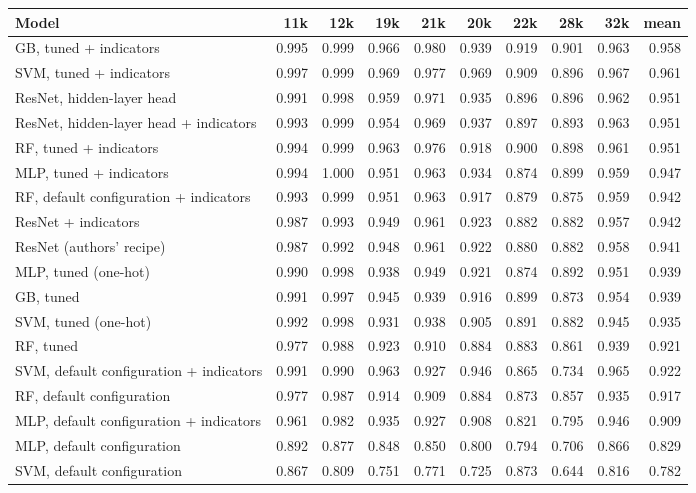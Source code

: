 \begin{tabular}{lrrrrrrrrr}
\toprule
Model & 11k & 12k & 19k & 21k & 20k & 22k & 28k & 32k & mean \\
\midrule
GB, tuned + indicators & 0.995 & 0.999 & 0.966 & 0.980 & 0.939 & 0.919 & 0.901 & 0.963 & 0.958 \\
SVM, tuned + indicators & 0.997 & 0.999 & 0.969 & 0.977 & 0.969 & 0.909 & 0.896 & 0.967 & 0.961 \\
ResNet, hidden-layer head & 0.991 & 0.998 & 0.959 & 0.971 & 0.935 & 0.896 & 0.896 & 0.962 & 0.951 \\
ResNet, hidden-layer head + indicators & 0.993 & 0.999 & 0.954 & 0.969 & 0.937 & 0.897 & 0.893 & 0.963 & 0.951 \\
RF, tuned + indicators & 0.994 & 0.999 & 0.963 & 0.976 & 0.918 & 0.900 & 0.898 & 0.961 & 0.951 \\
MLP, tuned + indicators & 0.994 & 1.000 & 0.951 & 0.963 & 0.934 & 0.874 & 0.899 & 0.959 & 0.947 \\
RF, default configuration + indicators & 0.993 & 0.999 & 0.951 & 0.963 & 0.917 & 0.879 & 0.875 & 0.959 & 0.942 \\
ResNet + indicators & 0.987 & 0.993 & 0.949 & 0.961 & 0.923 & 0.882 & 0.882 & 0.957 & 0.942 \\
ResNet (authors' recipe) & 0.987 & 0.992 & 0.948 & 0.961 & 0.922 & 0.880 & 0.882 & 0.958 & 0.941 \\
MLP, tuned (one-hot) & 0.990 & 0.998 & 0.938 & 0.949 & 0.921 & 0.874 & 0.892 & 0.951 & 0.939 \\
GB, tuned & 0.991 & 0.997 & 0.945 & 0.939 & 0.916 & 0.899 & 0.873 & 0.954 & 0.939 \\
SVM, tuned (one-hot) & 0.992 & 0.998 & 0.931 & 0.938 & 0.905 & 0.891 & 0.882 & 0.945 & 0.935 \\
RF, tuned & 0.977 & 0.988 & 0.923 & 0.910 & 0.884 & 0.883 & 0.861 & 0.939 & 0.921 \\
SVM, default configuration + indicators & 0.991 & 0.990 & 0.963 & 0.927 & 0.946 & 0.865 & 0.734 & 0.965 & 0.922 \\
RF, default configuration & 0.977 & 0.987 & 0.914 & 0.909 & 0.884 & 0.873 & 0.857 & 0.935 & 0.917 \\
MLP, default configuration + indicators & 0.961 & 0.982 & 0.935 & 0.927 & 0.908 & 0.821 & 0.795 & 0.946 & 0.909 \\
MLP, default configuration & 0.892 & 0.877 & 0.848 & 0.850 & 0.800 & 0.794 & 0.706 & 0.866 & 0.829 \\
SVM, default configuration & 0.867 & 0.809 & 0.751 & 0.771 & 0.725 & 0.873 & 0.644 & 0.816 & 0.782 \\
\bottomrule
\end{tabular}
